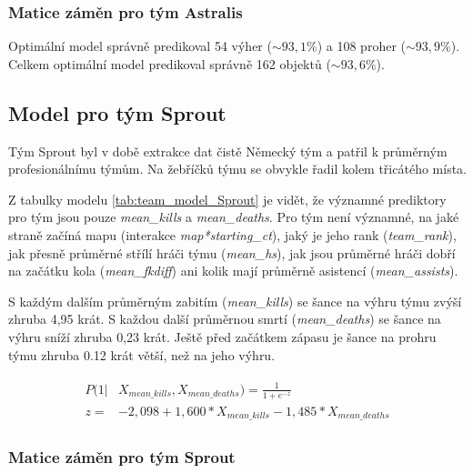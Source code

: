 \subsubsection{Matice záměn pro tým Astralis}



Optimální model správně predikoval 54 výher ($\sim 93,1\%$) a 108 proher ($\sim 93,9\%$). Celkem optimální model predikoval správně 162 objektů ($\sim 93,6\%$).



\subsection{Model pro tým Sprout}
Tým Sprout byl v době extrakce dat čistě Německý tým a patřil k průměrným profesionálnímu týmům. Na žebříčků týmu se obvykle řadil kolem třicátého místa.



Z tabulky modelu \ref{tab:team_model_Sprout} je vidět, že významné prediktory pro tým jsou pouze \textit{mean\_kills} a \textit{mean\_deaths}. Pro tým není významné,
na jaké straně začíná mapu (interakce \textit{map*starting\_ct}), jaký je jeho rank (\textit{team\_rank}), jak přesně průměrné střílí hráči týmu (\textit{mean\_hs}),
jak jsou průměrné hráči dobří na začátku kola (\textit{mean\_fkdiff}) ani kolik mají průměrně asistencí (\textit{mean\_assists}).



S každým dalším průměrným zabitím (\textit{mean\_kills}) se šance na výhru týmu zvýší zhruba 4,95 krát. S každou další průměrnou smrtí (\textit{mean\_deaths})
se šance na výhru sníží zhruba 0,23 krát. Ještě před začátkem zápasu je šance na prohru týmu zhruba 0.12 krát větší, než na jeho výhru.

\begin{align}
    \begin{split}
        P(1 | &X_{mean\_kills},  X_{mean\_deaths}) = \frac{1}{1 + e^{-z}} \\
        z = &-2,098 + 1,600*X_{mean\_kills} - 1,485*X_{mean\_deaths}
    \end{split}
\end{align}

\subsubsection{Matice záměn pro tým Sprout}

